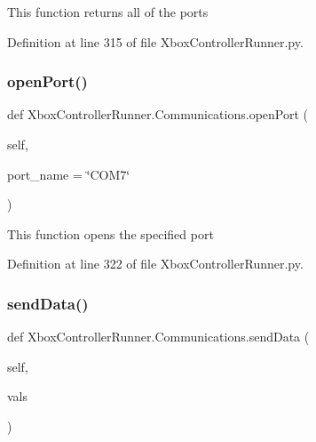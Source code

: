 \begin{DoxyVerb}This function returns all of the ports\end{DoxyVerb}
 

Definition at line 315 of file Xbox\+Controller\+Runner.\+py.

\mbox{\label{class_xbox_controller_runner_1_1_communications_a5a633896f720056b6d07bfbe0e435e16}} 
\subsubsection{\texorpdfstring{open\+Port()}{openPort()}}
{\footnotesize\ttfamily def Xbox\+Controller\+Runner.\+Communications.\+open\+Port (\begin{DoxyParamCaption}\item[{}]{self,  }\item[{}]{port\+\_\+name = {\ttfamily \char`\"{}COM7\char`\"{}} }\end{DoxyParamCaption})}

\begin{DoxyVerb}This function opens the specified port\end{DoxyVerb}
 

Definition at line 322 of file Xbox\+Controller\+Runner.\+py.

\mbox{\label{class_xbox_controller_runner_1_1_communications_a7bde537bb8a2b4079a8957a2a9f4331e}} 
\subsubsection{\texorpdfstring{send\+Data()}{sendData()}}
{\footnotesize\ttfamily def Xbox\+Controller\+Runner.\+Communications.\+send\+Data (\begin{DoxyParamCaption}\item[{}]{self,  }\item[{}]{vals }\end{DoxyParamCaption})}



